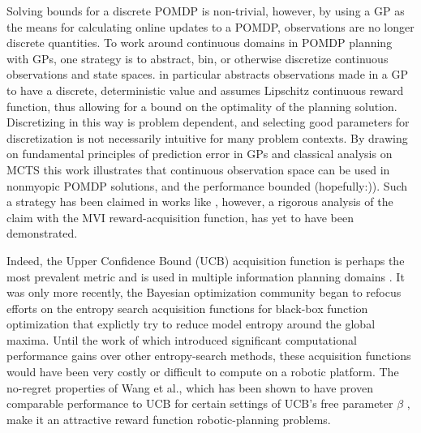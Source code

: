 \documentclass{styles/svproc}
\begin{document}
Solving bounds for a discrete POMDP is non-trivial, however, by using a GP as the means for calculating online updates to a POMDP, observations are no longer discrete quantities.  To work around continuous domains in POMDP planning with GPs, one strategy is to abstract, bin, or otherwise discretize continuous observations and state spaces. \cite{ling2016gaussian} in particular abstracts observations made in a GP to have a discrete, deterministic value and assumes  Lipschitz continuous reward function, thus allowing for a bound on the optimality of the planning solution. Discretizing in this way is problem dependent, and selecting good parameters for discretization is not necessarily intuitive for many problem contexts. By drawing on fundamental principles of prediction error in GPs \cite{Wagberg2017} and classical analysis on MCTS \cite{Kocsis2006} this work illustrates that continuous observation space can be used in nonmyopic POMDP solutions, and the performance bounded (hopefully:)). Such a strategy has been claimed in works like \cite{Arora2017}, however, a rigorous analysis of the claim with the MVI reward-acquisition function, has yet to have been demonstrated. 

Indeed, the Upper Confidence Bound (UCB) acquisition function is perhaps the most prevalent metric and is used in multiple information planning domains \cite{Carpentier2011, Contal2013, Srinivas2012a}. It was only more recently, the Bayesian optimization community began to refocus efforts on the entropy search acquisition functions for black-box function optimization \cite{hennig2012entropy, hernandez2014predictive, wang2017max} that explictly try to reduce model entropy around the global maxima. Until the work of \cite{wang2017max} which introduced significant computational performance gains over other entropy-search methods, these acquisition functions would have been very costly or difficult to compute on a robotic platform. The no-regret properties of Wang et al., which has been shown to have proven comparable performance to UCB for certain settings of UCB's free parameter $\beta$ \cite{wang2016optimization}, make it an attractive reward function robotic-planning problems. 




\end{document}
